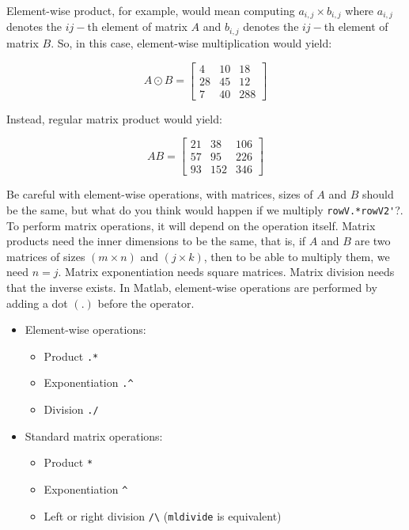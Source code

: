 \documentclass[a4paper,11pt]{article}
\begin{document}
Element-wise product, for example, would mean computing  $a_{i,j} \times b_{i,j}$ where $a_{i,j}$ denotes the $ij-$th element of matrix $A$ and $b_{i,j}$ denotes the $ij-$th element of matrix $B$. So, in this case, element-wise multiplication would yield:

\[
A \odot B = 
\begin{bmatrix}
     4  &  10 &   18 \\
    28  &  45 &   12 \\
     7  &  40 &  288
\end{bmatrix}
\]

Instead, regular matrix product would yield:

\[
AB = 
\begin{bmatrix}
  21  & 38 &  106 \\
  57  & 95 &  226 \\
  93  & 152 &  346
\end{bmatrix}
\]

Be careful with element-wise operations, with matrices, sizes of $A$ and $B$ should be the same, but what do you think would happen if we multiply \verb+rowV.*rowV2'+?. To perform matrix operations, it will depend on the operation itself. Matrix products need the inner dimensions to be the same, that is, if $A$ and $B$ are two matrices of sizes $(m\times n)$ and $(j \times k)$, then to be able to multiply them, we need $n = j$. Matrix exponentiation needs square matrices. Matrix division needs that the inverse exists. In Matlab, element-wise operations are performed by adding a dot $(.)$ before the operator.

\begin{itemize}
	\item Element-wise operations:
	\begin{itemize}
		\item Product \verb+.*+
		\item Exponentiation \verb+.^+
		\item Division \verb+./+		
	\end{itemize}
	\item Standard matrix operations:
	\begin{itemize}
		\item Product \verb;*;
		\item Exponentiation \verb;^;
		\item Left or right division \verb;/\; (\verb;mldivide; is equivalent)
	\end{itemize}
\end{itemize}
\end{document}
